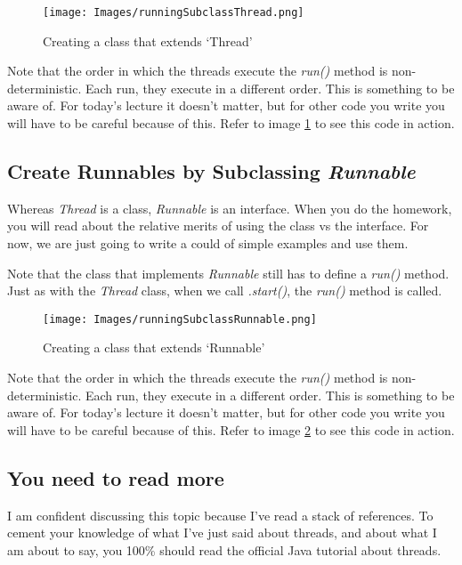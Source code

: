 \documentclass[12pt]{article}
\begin{document}


\begin{figure}[ht]
  \label{runningSubclassThread}
  \centering
    \texttt{[image: Images/runningSubclassThread.png]}
  \caption{Creating a class that extends `Thread'}
\end{figure}


Note that the order in which the threads execute the \textit{run()} method is
non-deterministic. Each run, they execute in a different order. This is
something to be aware of. For today's lecture it doesn't matter, but for other
code you write you will have to be careful because of this. Refer to image
\ref{runningSubclassThread} to see this code in action.

\subsection{Create Runnables by Subclassing \textit{Runnable}}

Whereas \textit{Thread} is a class, \textit{Runnable} is an interface. When you
do the homework, you will read about the relative merits of using the class vs
the interface. For now, we are just going to write a could of simple examples
and use them.

Note that the class that implements \textit{Runnable} still has to define a
\textit{run()} method. Just as with the \textit{Thread} class, when we call
\textit{.start()}, the \textit{run()} method is called.




\begin{figure}[ht]
  \label{runningSubclassRunnable}
  \centering
    \texttt{[image: Images/runningSubclassRunnable.png]}
  \caption{Creating a class that extends `Runnable'}
\end{figure}


Note that the order in which the threads execute the \textit{run()} method is
non-deterministic. Each run, they execute in a different order. This is
something to be aware of. For today's lecture it doesn't matter, but for other
code you write you will have to be careful because of this. Refer to image
\ref{runningSubclassRunnable} to see this code in action.


\subsection{You need to read more}
I am confident discussing this topic because I've read a stack of references. To
cement your knowledge of what I've just said about threads, and about what I am
about to say, you 100\% should read the official Java tutorial about threads.
\end{document}
